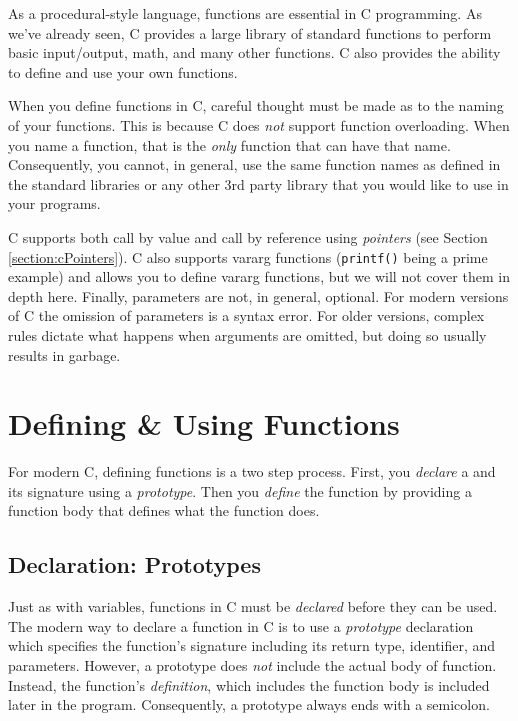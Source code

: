 

As a procedural-style language, functions are essential in C 
programming.  As we've already seen, C provides a large
library of standard functions to perform basic input/output, 
math, and many other functions.  C also provides the ability 
to define and use your own functions.

When you define functions in C, careful thought must be 
made as to the naming of your functions.  This is because
C does \emph{not} support function overloading.  When you
name a function, that is the \emph{only} function that can
have that name.  Consequently, you cannot, in general,
use the same function names as defined in the standard 
libraries or any other 3rd party library that you would like
to use in your programs.

C supports both call by value and call by reference using
\emph{pointers} (see Section \ref{section:cPointers}).  C
also supports vararg functions (\texttt{printf()} being
a prime example) and allows you to define vararg functions, 
but we will not cover them in depth here.  Finally, 
parameters are not, in general, optional.  For modern 
versions of C the omission of parameters is a syntax error.
For older versions, complex rules dictate what happens
when arguments are omitted, but doing so usually results
in garbage.

\section{Defining \& Using Functions}

For modern C, defining functions is a two step process.  First,
you \emph{declare} a and its signature using a \emph{prototype}.  
Then you \emph{define} the
function by providing a function body that defines what the
function does.

\subsection{Declaration: Prototypes}

Just as with variables, functions in C must be \emph{declared} before
they can be used.  The modern way to declare a function in C is to
use a \emph{prototype} declaration which specifies the function's
signature including its return type, identifier, and parameters.  However,
a prototype does \emph{not} include the actual body of function. 
Instead, the function's \emph{definition}, which includes the function body is
included later in the program.  Consequently, a prototype always 
ends with a semicolon.  

